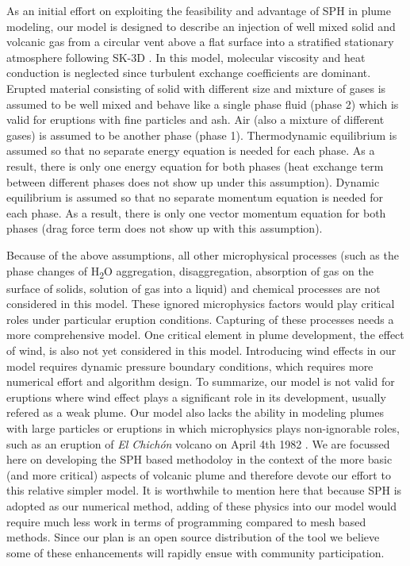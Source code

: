 \documentclass[gmd, manuscript]{copernicus}
\begin{document}
As an initial effort on exploiting the feasibility and advantage of SPH in plume modeling, our model is designed to describe an injection of well mixed solid and volcanic gas from a circular vent above a flat surface into a stratified stationary atmosphere following SK-3D \citep{suzuki2005numerical}. In this model, molecular viscosity and heat conduction is neglected since turbulent exchange coefficients are dominant. Erupted material consisting of solid with different size and mixture of gases is assumed to be well mixed and behave like a single phase fluid (phase 2) which is valid for eruptions with fine particles and ash. Air (also a mixture of different gases) is assumed to be another phase (phase 1). Thermodynamic equilibrium is assumed so that no separate energy equation is needed for each phase. As a result, there is only one energy equation for both phases (heat exchange term between different phases does not show up under this assumption). Dynamic equilibrium is assumed so that no separate momentum equation is needed for each phase. As a result, there is only one vector momentum equation for both phases (drag force term does not show up with this assumption). 

Because of the above assumptions, all other microphysical processes (such as the phase changes of \texorpdfstring{H\textsubscript{2}O}, aggregation, disaggregation, absorption of gas on the surface of solids, solution of gas into a liquid) and chemical processes are not considered in this model. These ignored microphysics factors would play critical roles under particular eruption conditions. Capturing of these processes needs a more comprehensive model. One critical element in plume development, the effect of wind, is also not yet considered in this model. Introducing wind effects in our model requires dynamic pressure boundary conditions, which requires more numerical effort and algorithm design. To summarize, our model is not valid for eruptions where wind effect plays a significant role in its development, usually refered as a weak plume. Our model also lacks the ability in modeling plumes with large particles or eruptions in which microphysics plays non-ignorable roles, such as an eruption of \textit{El Chich{\'o}n} volcano on April 4th 1982 \citep{sigurdsson19841982, folch2016fplume}. We are focussed here on developing the SPH based methodoloy in the context of the more basic (and more critical) aspects of volcanic plume and therefore devote our effort to this relative simpler model. It is worthwhile to mention here that because SPH is adopted as our numerical method, adding of these physics into our model would require much less work in terms of programming compared to mesh based methods. Since our plan is an open source distribution of the tool we believe some of these enhancements will rapidly ensue with community participation.
\end{document}
